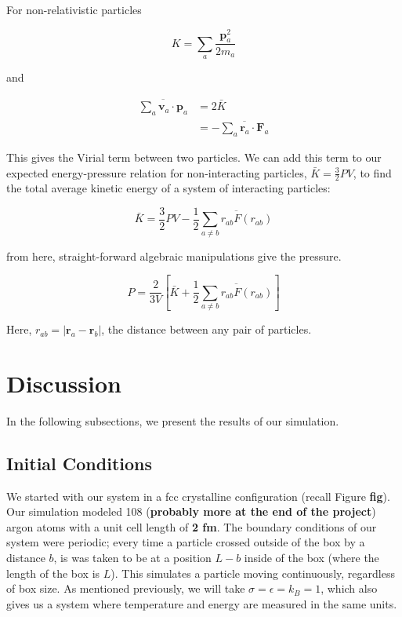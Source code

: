 \documentclass{article}
\begin{document}
\begin{multicols}{2}
\noindent  For non-relativistic particles 

\begin{equation}
K = \sum \limits _a \frac{\textbf{p}_{a}^2}{2m_a}
\end{equation}

\noindent and 

\begin{equation}
\begin{split}
\overline{\sum \limits _a \textbf{v}_a \cdot \textbf{p}_a} & = 2\bar{K} \\
& = - \overline{\sum \limits _a \textbf{r}_a \cdot \textbf{F}_a}
\end{split}
\end{equation}

\noindent This gives the Virial term between two particles.  We can add this term to our expected energy-pressure relation for non-interacting particles, $\bar{K}=\frac{3}{2}PV$, to find the total average kinetic energy of a system of interacting particles:  

\begin{equation}
\bar{K} = \frac{3}{2} PV - \frac{1}{2} \overline{\sum \limits _{a \ne b} r_{ab} F(r_{ab})}
\end{equation}

\noindent from here, straight-forward algebraic manipulations give the pressure.

\begin{equation}
P = \frac{2}{3V} \left [ \bar{K} + \frac{1}{2} \overline{\sum \limits _{a\ne b} r_{ab} F(r_{ab})} \right ]
\end{equation}

\noindent Here, $r_{ab} = |\textbf{r}_a - \textbf{r}_b|$, the distance between any pair of particles.

\section{Discussion}
\label{disc}
In the following subsections, we present the results of our simulation.

\subsection{Initial Conditions}

We started with our system in a fcc crystalline configuration (recall Figure \textbf{fig}).  Our simulation modeled  108 (\textbf{probably more at the end of the project}) argon atoms with a unit cell length of \textbf{2 fm}.  The boundary conditions of our system were periodic; every time a particle crossed outside of the box by a distance $b$, is was taken to be at a position $L-b$ inside of the box (where the length of the box is $L$).  This simulates a particle moving continuously, regardless of box size.  As mentioned previously, we will take $\sigma=\epsilon=k_B=1$, which also gives us a system where temperature and energy are measured in the same units.  


\end{multicols}
\end{document}
